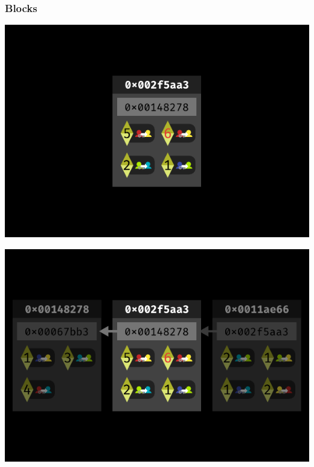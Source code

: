 \documentclass[xcolor=x11names,compress]{beamer}
\begin{document}
\begin{frame}
	\frametitle{Blocks}
	\begin{overprint}
		\begin{center}
			\includegraphics[width=\textwidth,height=0.8\textheight,keepaspectratio]{img/block/01.pdf}
		\end{center}
		\begin{center}
			\includegraphics[width=\textwidth,height=0.8\textheight,keepaspectratio]{img/block/02.pdf}
		\end{center}
	\end{overprint}
\end{frame}
\end{document}
